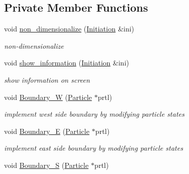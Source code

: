 \subsection*{Private Member Functions}
\begin{CompactItemize}
\item 
\hypertarget{classBoundary_bdce0051ff1e2651413242877a4fc507}{
void \hyperlink{classBoundary_bdce0051ff1e2651413242877a4fc507}{non\_\-dimensionalize} (\hyperlink{classInitiation}{Initiation} \&ini)}
\label{classBoundary_bdce0051ff1e2651413242877a4fc507}

\begin{CompactList}\small\item\em non-dimensionalize \item\end{CompactList}\item 
void \hyperlink{classBoundary_116df4b717184d962f40bdc88de26763}{show\_\-information} (\hyperlink{classInitiation}{Initiation} \&ini)
\begin{CompactList}\small\item\em show information on screen \item\end{CompactList}\item 
\hypertarget{classBoundary_8879fae60c663d0bdf55acf44516cd42}{
void \hyperlink{classBoundary_8879fae60c663d0bdf55acf44516cd42}{Boundary\_\-W} (\hyperlink{classParticle}{Particle} $\ast$prtl)}
\label{classBoundary_8879fae60c663d0bdf55acf44516cd42}

\begin{CompactList}\small\item\em implement west side boundary by modifying particle states \item\end{CompactList}\item 
\hypertarget{classBoundary_e721f2c23112698b3cee9a3848f3deb1}{
void \hyperlink{classBoundary_e721f2c23112698b3cee9a3848f3deb1}{Boundary\_\-E} (\hyperlink{classParticle}{Particle} $\ast$prtl)}
\label{classBoundary_e721f2c23112698b3cee9a3848f3deb1}

\begin{CompactList}\small\item\em implement east side boundary by modifying particle states \item\end{CompactList}\item 
\hypertarget{classBoundary_50c82df28f8e11186b2f3e6f0bd971b0}{
void \hyperlink{classBoundary_50c82df28f8e11186b2f3e6f0bd971b0}{Boundary\_\-S} (\hyperlink{classParticle}{Particle} $\ast$prtl)}
\label{classBoundary_50c82df28f8e11186b2f3e6f0bd971b0}


\end{CompactItemize}
